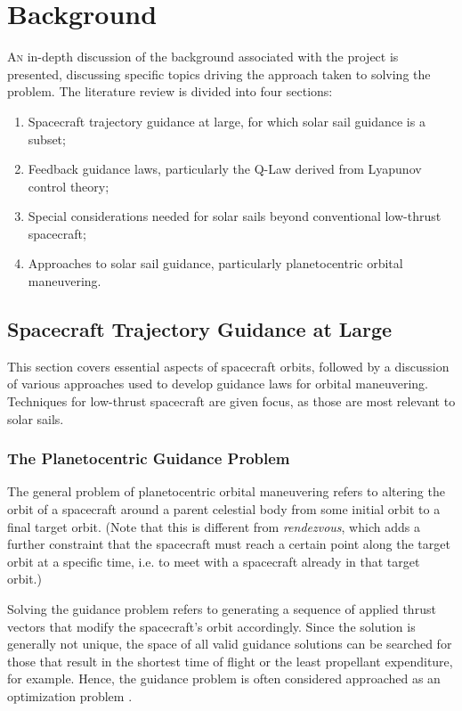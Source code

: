 \chapter{Background}

\lettrine{A}{n} in-depth discussion of the background associated with the project is presented, discussing specific topics driving the approach taken to solving the problem. The literature review is divided into four sections:
\begin{enumerate}
  \item Spacecraft trajectory guidance at large, for which solar sail guidance is a subset;
  \item Feedback guidance laws, particularly the Q-Law derived from Lyapunov control theory;
  \item Special considerations needed for solar sails beyond conventional low-thrust spacecraft;
  \item Approaches to solar sail guidance, particularly planetocentric orbital maneuvering.
\end{enumerate}

\section{Spacecraft Trajectory Guidance at Large}

This section covers essential aspects of spacecraft orbits, followed by a discussion of various approaches used to develop guidance laws for orbital maneuvering. Techniques for low-thrust spacecraft are given focus, as those are most relevant to solar sails.

\subsection{The Planetocentric Guidance Problem}
The general problem of planetocentric orbital maneuvering refers to altering the orbit of a spacecraft around a parent celestial body from some initial orbit to a final target orbit. (Note that this is different from \textit{rendezvous}, which adds a further constraint that the spacecraft must reach a certain point along the target orbit at a specific time, i.e. to meet with a spacecraft already in that target orbit.)



Solving the guidance problem refers to generating a sequence of applied thrust vectors that modify the spacecraft's orbit accordingly. Since the solution is generally not unique, the space of all valid guidance solutions can be searched for those that result in the shortest time of flight or the least propellant expenditure, for example. Hence, the guidance problem is often considered approached as an optimization problem \cite{yam2011low}.

